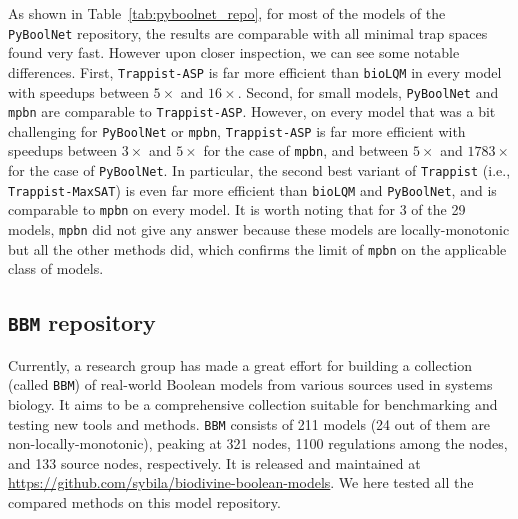 \documentclass[preprint,12pt]{elsarticle}
\begin{document}
As shown in Table~\ref{tab:pyboolnet_repo}, for most of the models of the \texttt{PyBoolNet} repository, the results are comparable with all minimal trap spaces found very fast.
However upon closer inspection, we can see some notable differences.
First, \texttt{Trappist-ASP} is far more efficient than \texttt{bioLQM} in every model with speedups between \(5\times\) and \(16 \times\).
Second, for small models, \texttt{PyBoolNet} and \texttt{mpbn} are comparable to \texttt{Trappist-ASP}.
However, on every model that was a bit challenging for \texttt{PyBoolNet} or \texttt{mpbn}, \texttt{Trappist-ASP} is far more efficient with speedups between \(3\times\) and \(5 \times\) for the case of \texttt{mpbn}, and between \(5\times\) and \(1783 \times\) for the case of \texttt{PyBoolNet}.
In particular, the second best variant of \texttt{Trappist} (i.e., \texttt{Trappist-MaxSAT}) is even far more efficient than \texttt{bioLQM} and \texttt{PyBoolNet}, and is comparable to \texttt{mpbn} on every model.
It is worth noting that for 3 of the 29 models, \texttt{mpbn} did not give any answer because these models are locally-monotonic but all the other methods did, which confirms the limit of \texttt{mpbn} on the applicable class of models.


\subsection{\texttt{BBM} repository}

Currently, a research group has made a great effort for building a collection (called \texttt{BBM}) of real-world Boolean models from various sources used in systems biology.
It aims to be a comprehensive collection suitable for benchmarking and testing new tools and methods.
\texttt{BBM} consists of 211 models (24 out of them are non-locally-monotonic), peaking at 321 nodes, 1100 regulations among the nodes, and 133 source nodes, respectively.
It is released and maintained at \url{https://github.com/sybila/biodivine-boolean-models}.
We here tested all the compared methods on this model repository.
\end{document}
